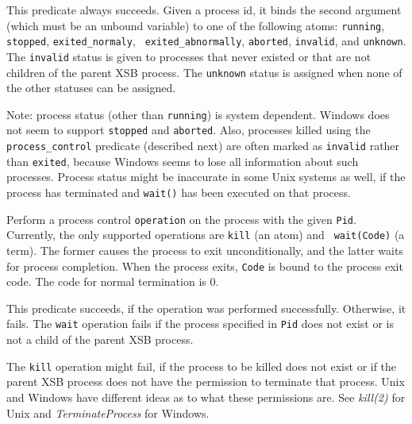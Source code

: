 \begin{description}
  This predicate always succeeds. Given a process id, it binds the second
  argument (which must be an unbound variable) to one of the following
  atoms: {\tt running}, {\tt stopped}, {\tt exited\_normaly}, {\tt
    exited\_abnormally}, {\tt aborted}, {\tt invalid}, and {\tt unknown}.
  The {\tt invalid} status is given to processes that never existed or that
  are not children of the parent XSB process. The {\tt unknown} status is
  assigned when none of the other statuses can be assigned.
  
  Note: process status (other than {\tt running}) is system dependent.
  Windows does not seem to support {\tt stopped} and {\tt aborted}.  Also,
  processes killed using the \verb|process_control| predicate (described
  next) are often marked as {\tt invalid} rather than {\tt exited}, because
  Windows seems to lose all information about such processes. Process
  status might be inaccurate in some Unix systems as well, if the process
  has terminated and {\tt wait()} has been executed on that process.

    Perform a process control {\tt operation} on the process with the given
    {\tt Pid}. 
    Currently, the only supported operations are {\tt kill} (an atom) and {\tt
    wait(Code)} (a term).
    The former causes the process to exit unconditionally, and the latter
    waits for process completion. When the process exits, {\tt Code} is
    bound to the process exit code. The code for normal termination is 0.

    This predicate succeeds, if the operation was performed successfully.
    Otherwise, it fails. The {\tt wait} operation fails if the process
    specified in {\tt Pid} does not exist or is not a child of the parent
    XSB process. 
    
    The {\tt kill} operation might fail, if the process to be killed does
    not exist or if the parent XSB process does not have the permission to
    terminate that process. Unix and Windows have different ideas as to
    what these permissions are. See \emph{kill(2)} for Unix and
    \emph{TerminateProcess} for Windows.
    

\end{description}
